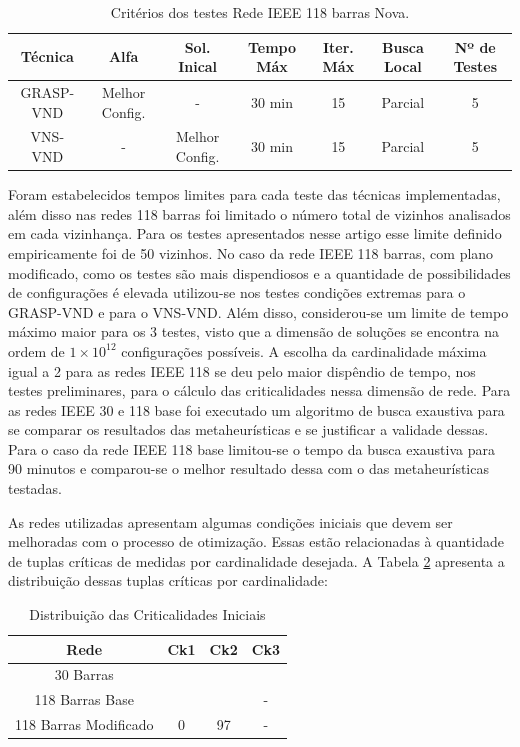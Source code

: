 \documentclass[12pt]{article}
\begin{document}
\begin{table}[H]
	\centering
	\caption{Critérios dos testes Rede IEEE 118 barras Nova.}
	\begin{tabular}{|c|c|c|c|c|c|c|}
		\hline
		\textbf{Técnica} & \textbf{Alfa} & \textbf{Sol. Inical} & \textbf{Tempo Máx} & \textbf{Iter. Máx} & \textbf{Busca Local} & \textbf{Nº de Testes} \\
		\hline
		GRASP-VND & Melhor Config.   & -     & 30 min & 15    & Parcial & 5 \\
		\hline
		VNS-VND & -     & Melhor Config. & 30 min & 15    & Parcial & 5 \\
		\hline
	\end{tabular}%
	\label{tab4}%
\end{table}%

Foram estabelecidos tempos limites para cada teste das técnicas implementadas, além disso nas redes 118 barras foi limitado o número total de vizinhos analisados em cada vizinhança. Para os testes apresentados nesse artigo esse limite definido empiricamente foi de 50 vizinhos. No caso da rede IEEE 118 barras, com plano modificado, como os testes são mais dispendiosos e a quantidade de possibilidades de configurações é elevada utilizou-se nos testes condições extremas para o GRASP-VND e para o VNS-VND. Além disso, considerou-se um limite de tempo máximo maior para os 3 testes, visto que a dimensão de soluções se encontra na ordem de $1 \times 10^{12}$ configurações possíveis. A escolha da cardinalidade máxima igual a 2 para as redes IEEE 118 se deu pelo maior dispêndio de tempo, nos testes preliminares, para o cálculo das criticalidades nessa dimensão de rede. Para as redes IEEE 30 e 118 base foi executado um algoritmo de busca exaustiva para se comparar os resultados das metaheurísticas e se justificar a validade dessas. Para o caso da rede IEEE 118 base limitou-se o tempo da busca exaustiva para 90 minutos e comparou-se o melhor resultado dessa com o das metaheurísticas testadas.

As redes utilizadas apresentam algumas condições iniciais que devem ser melhoradas com o processo de otimização. Essas estão relacionadas à quantidade de tuplas críticas de medidas por cardinalidade desejada. A Tabela \ref{tab5} apresenta a distribuição dessas tuplas críticas por cardinalidade:

\begin{table}[H]
	\centering
	\caption{Distribuição das Criticalidades Iniciais}
	\begin{tabular}{|c|c|c|c|}
		\hline
		\textbf{Rede } & \textbf{Ck1} & \textbf{Ck2} & \textbf{Ck3} \\
		\hline
		30 Barras &       &       &  \\
		\hline
		118 Barras Base &       &       & - \\
		\hline
		118 Barras Modificado &   0     & 97       &  - \\
		\hline
	\end{tabular}%
	\label{tab5}%
\end{table}%
\end{document}

